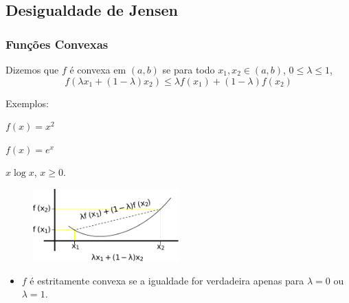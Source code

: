 \subsection{Desigualdade de Jensen}
\begin{frame}%
  \frametitle{Funções Convexas}
   \begin{definition}
   Dizemos que $f$ é convexa em $(a,b)$ se para todo $x_1,x_2 \in (a,b)$, $0 \leq \lambda \leq 1$,
   \begin{equation}
   f(\lambda x_1 + (1 - \lambda)x_2) \leq \lambda f(x_1) + (1-\lambda) f(x_2)
   \end{equation}
   \end{definition}
   Exemplos:  
    \begin{inlineenumerate}
        \item $f(x)=x^2$
        \item $f(x)=e^x$
        \item $x \log x$, $x \geq 0$.
    \end{inlineenumerate}
  \begin{figure}[h!]
  \centering
  \includegraphics[width=0.5\textwidth]{images/funcao-convexa.pdf}
  \label{fig:funcao-convexa}
  \end{figure}
  \begin{itemize}
  \item $f$ é estritamente convexa se a igualdade for verdadeira 
  apenas para $\lambda = 0$ ou $\lambda = 1$.
  \end{itemize}
\end{frame}

